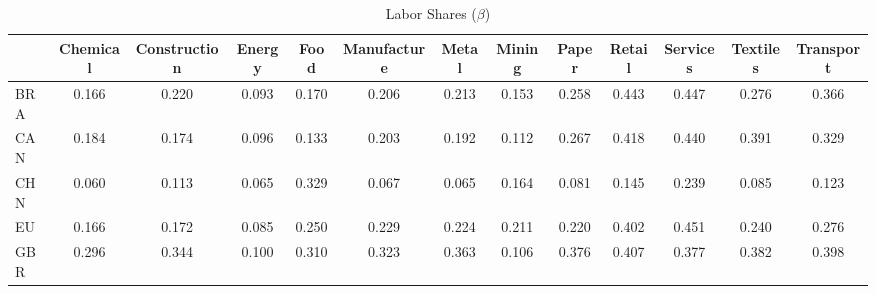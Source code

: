 \begin{table}[htbp]
\centering
\caption{Labor Shares ($\beta$)} 
\label{tab:beta}
\begin{tabular}{lcccccccccccc}
  \hline
 & Chemical & Construction & Energy & Food & Manufacture & Metal & Mining & Paper & Retail & Services & Textiles & Transport \\ 
  \hline
BRA & \textcolor[RGB]{162,104,94}{0.166} & \textcolor[RGB]{106,69,149}{0.220} & \textcolor[RGB]{219,142,36}{0.093} & \textcolor[RGB]{153,99,102}{0.170} & \textcolor[RGB]{121,78,134}{0.206} & \textcolor[RGB]{115,74,140}{0.213} & \textcolor[RGB]{170,110,85}{0.153} & \textcolor[RGB]{81,52,174}{0.258} & \textcolor[RGB]{13,8,242}{0.443} & \textcolor[RGB]{8,5,246}{0.447} & \textcolor[RGB]{74,48,181}{0.276} & \textcolor[RGB]{51,33,204}{0.366} \\ 
  CAN & \textcolor[RGB]{140,91,115}{0.184} & \textcolor[RGB]{144,94,110}{0.174} & \textcolor[RGB]{215,139,40}{0.096} & \textcolor[RGB]{185,120,70}{0.133} & \textcolor[RGB]{128,82,128}{0.203} & \textcolor[RGB]{138,89,117}{0.192} & \textcolor[RGB]{202,131,53}{0.112} & \textcolor[RGB]{77,50,178}{0.267} & \textcolor[RGB]{21,14,234}{0.418} & \textcolor[RGB]{15,10,240}{0.440} & \textcolor[RGB]{38,25,217}{0.391} & \textcolor[RGB]{62,40,193}{0.329} \\ 
  CHN & \textcolor[RGB]{249,161,6}{0.060} & \textcolor[RGB]{200,129,55}{0.113} & \textcolor[RGB]{238,154,17}{0.065} & \textcolor[RGB]{59,38,196}{0.329} & \textcolor[RGB]{236,153,19}{0.067} & \textcolor[RGB]{240,155,15}{0.065} & \textcolor[RGB]{164,106,91}{0.164} & \textcolor[RGB]{227,147,28}{0.081} & \textcolor[RGB]{181,117,74}{0.145} & \textcolor[RGB]{94,61,162}{0.239} & \textcolor[RGB]{221,143,34}{0.085} & \textcolor[RGB]{191,124,64}{0.123} \\ 
  EU & \textcolor[RGB]{159,103,96}{0.166} & \textcolor[RGB]{151,98,104}{0.172} & \textcolor[RGB]{223,144,32}{0.085} & \textcolor[RGB]{85,55,170}{0.250} & \textcolor[RGB]{98,63,157}{0.229} & \textcolor[RGB]{100,65,155}{0.224} & \textcolor[RGB]{119,77,136}{0.211} & \textcolor[RGB]{108,70,147}{0.220} & \textcolor[RGB]{32,21,223}{0.402} & \textcolor[RGB]{4,3,251}{0.451} & \textcolor[RGB]{91,59,164}{0.240} & \textcolor[RGB]{72,47,183}{0.276} \\ 
  GBR & \textcolor[RGB]{70,45,185}{0.296} & \textcolor[RGB]{55,36,200}{0.344} & \textcolor[RGB]{210,136,45}{0.100} & \textcolor[RGB]{68,44,187}{0.310} & \textcolor[RGB]{64,41,191}{0.323} & \textcolor[RGB]{53,34,202}{0.363} & \textcolor[RGB]{204,132,51}{0.106} & \textcolor[RGB]{49,32,206}{0.376} & \textcolor[RGB]{28,18,227}{0.407} & \textcolor[RGB]{47,30,208}{0.377} & \textcolor[RGB]{40,26,215}{0.382} & \textcolor[RGB]{34,22,221}{0.398} \\ 

\end{tabular}
\end{table}
